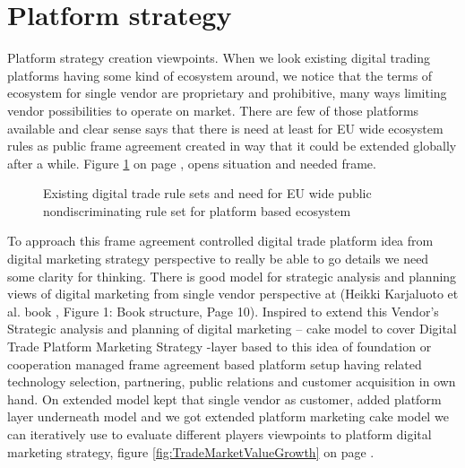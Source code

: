 \section{Platform strategy}
\label{platform_strategy}

Platform strategy creation viewpoints.
When we look ex\-ist\-ing digital trading platforms having some kind of ecosystem around, we notice that the terms of ecosystem for single vendor are proprietary and prohibitive, many ways limiting vendor possibilities to operate on market. There are few of those platforms available and clear sense says that there is need at least for EU wide ecosystem rules as public frame agreement created in way that it could be extended globally after a while. Figure \ref{fig:TermSets} on page \pageref{fig:TermSets}, opens situation and needed frame.

\begin{figure} %
 \begin{center}
  \caption{Existing digital trade rule sets and need for EU wide public nondiscriminating rule set for platform based ecosystem}
  \label{fig:TermSets}
 \end{center}
\end{figure}

To approach this frame agreement controlled digital trade platform idea from digital marketing strategy perspective to really be able to go details we need some clarity for thinking. There is good model for strategic analysis and planning views of digital marketing from single vendor perspective at (Heikki Karjaluoto et al. book \cite{Karjaluoto2022}, Figure 1: Book structure, Page 10). Inspired to extend this Vendor's Strategic analysis and planning of digital marketing -- cake model to cover Digital Trade Platform Marketing Strategy -layer based to this idea of foundation or cooperation managed frame agreement based platform setup having related technology selection, partnering, public relations and customer acquisition in own hand. On extended model kept that single vendor as customer, added platform layer underneath model and we got extended platform marketing cake model we can iteratively use to evaluate different players viewpoints to platform digital marketing strategy, figure \ref{fig:TradeMarketValueGrowth} on page \pageref{fig:TradeMarketValueGrowth}.

